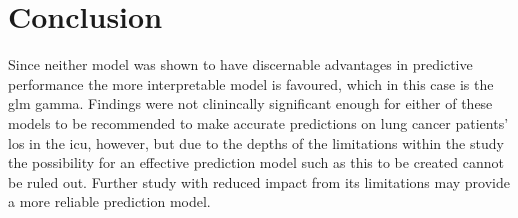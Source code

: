 \documentclass[11pt]{article}
\newcounter{savepage}
\begin{document}
\section{Conclusion}
Since neither model was shown to have discernable advantages in predictive performance the more interpretable model is favoured, which in this case is the \gls{glm} gamma. Findings were not clinincally significant enough for either of these models to be recommended to make accurate predictions on lung cancer patients' \gls{los} in the \gls{icu}, however, but due to the depths of the limitations within the study the possibility for an effective prediction model such as this to be created cannot be ruled out. Further study with reduced impact from its limitations may provide a more reliable prediction model.


\newpage
\clearpage
{}
\setcounter{page}{\value{savepage}} 
\addtocounter{page}{1}

{}

\printbibliography
\end{document}
